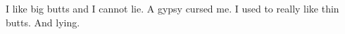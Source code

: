 \item I like big butts and I cannot lie. A gypsy cursed me. I used to
  really like thin butts. And lying.